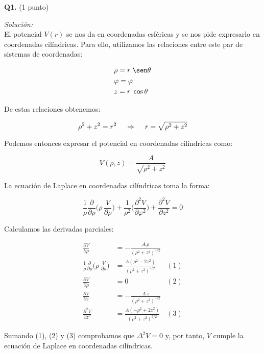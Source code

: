 \textbf{Q1.} (1 punto)


\vspace{20px}
\textit{Solución:}
\\

El potencial $V(r)$ se nos da en coordenadas esféricas y se nos pide expresarlo en coordenadas cilíndricas. Para ello,
utilizamos las relaciones entre este par de sistemas de coordenadas:

\begin{align*}
    & \rho = r \; \sen\theta \\
    & \varphi = \varphi \\
    & z = r \; \cos\theta
\end{align*}

De estas relaciones obtenemos:

\begin{equation*}
    \rho^2 + z^2 = r^2 \hspace{12px} \Rightarrow  \hspace{12px} r = \sqrt{ \rho^2 + z^2}
\end{equation*}

Podemos entonces expresar el potencial en coordenadas cilíndricas como:

\begin{equation*}
    V(\rho, z) = \frac{A}{\sqrt{ \rho^2 + z^2}}
\end{equation*}

La ecuación de Laplace en coordenadas cilíndricas toma la forma:

\begin{equation*}
    \frac{1}{\rho} \frac{\partial}{\partial \rho} \biggl( \rho \, \frac{V}{\partial \rho} \biggr)
    +
    \frac{1}{\rho^2}  \biggl( \frac{\partial^2 V}{\partial \varphi^2} \biggr)
    +
    \frac{\partial^2 V}{\partial z^2} = 0
\end{equation*}

Calculamos las derivadas parciales:

\begin{align*}
    \frac{\partial V}{\partial \rho}   & = - \frac{A \, \rho}{(\rho^2 + z^2)^{3/2}} & \\[12px]
    \frac{1}{\rho} \frac{\partial}{\partial \rho}  \biggl( \rho \, \frac{V}{\partial \rho} \biggr)  & =
    \frac{A ( \rho^2 - 2z^2)}{(\rho^2 + z^2)^{5/2}} & (1) \\[12px]
    \frac{\partial V}{\partial \rho} &= 0 & (2) \\[12px]
    \frac{\partial V}{\partial z} &= - \frac{A \, z}{(\rho^2 + z^2)^{3/2}} &  \\[12px]
    \frac{\partial^2 V}{\partial z^2} &= \frac{A (- \rho^2 + 2z^2)}{(\rho^2 + z^2)^{5/2}} & (3)
\end{align*}

Sumando (1), (2) y (3) comprobamos que $\Delta^2 V = 0$ y, por tanto, $V$ cumple la ecuación de Laplace en coordenadas cilíndricas.




